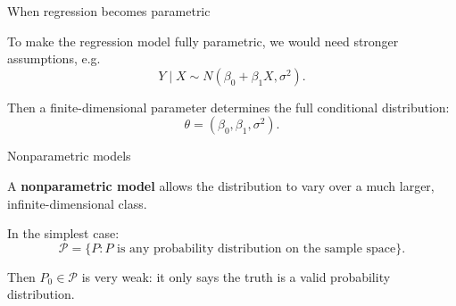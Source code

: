 \documentclass[xcolor={table}, handout]{beamer}
\begin{document}
\note{
\scriptsize \singlespacing

}
\begin{frame}{When regression becomes parametric}

\begin{wideitemize}
\item To make the regression model fully parametric, we would need stronger assumptions, e.g.
\[
Y\mid X \sim N(\beta_0+\beta_1X,\sigma^2).
\]\pause
\item Then a finite-dimensional parameter determines the full conditional distribution:
\[
\theta=(\beta_0,\beta_1,\sigma^2).
\]
\end{wideitemize}

\end{frame}

\note{
\scriptsize \singlespacing

}
\begin{frame}{Nonparametric models}

\begin{wideitemize}
\item A \textbf{nonparametric model} allows the distribution to vary over a much larger, infinite-dimensional class.\pause
\item In the simplest case:
\[
\mathcal{P}
  =
  \{P: P \text{ is any probability distribution on the sample space}\}.
\]\pause
\item Then $P_0\in\mathcal{P}$ is very weak: it only says the truth is a valid probability distribution.
\end{wideitemize}

\end{frame}
\end{document}

